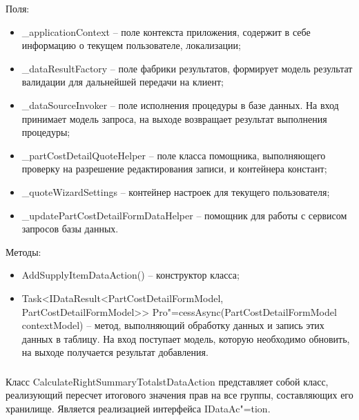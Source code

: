 Поля:
\begin{itemize}
  \item \_applicationContext – поле контекста приложения, содержит в себе информацию о текущем пользователе, локализации;
  \item \_dataResultFactory – поле фабрики результатов, формирует модель результат валидации для дальнейшей передачи на клиент;
  \item \_dataSourceInvoker – поле исполнения процедуры в базе данных. На вход принимает модель запроса, на выходе возвращает результат выполнения процедуры;
  \item \_partCostDetailQuoteHelper – поле класса помощника, выполняющего проверку на разрешение редактирования записи, и контейнера констант;
  \item \_quoteWizardSettings – контейнер настроек для текущего пользователя;
  \item \_updatePartCostDetailFormDataHelper – помощник для работы с сервисом запросов базы данных.
\end{itemize}

Методы:
\begin{itemize}
  \item AddSupplyItemDataAction() – конструктор класса;
  \item Task<IDataResult<PartCostDetailFormModel, PartCostDetailFormModel>> Pro"=cessAsync(PartCostDetailFormModel contextModel) – метод, выполняющий обработку данных и запись этих данных в таблицу. На вход поступает модель, которую необходимо обновить, на выходе получается результат добавления.
\end{itemize}

\subsubsection{}
\label{sub:arch_and_mod:data_layer:calculate_right_summary_totalst}

Класс CalculateRightSummaryTotalstDataAction представляет собой класс, реализующий пересчет итогового значения прав на все группы, составляющих его хранилище. Является реализацией интерфейса IDataAc"=tion.

